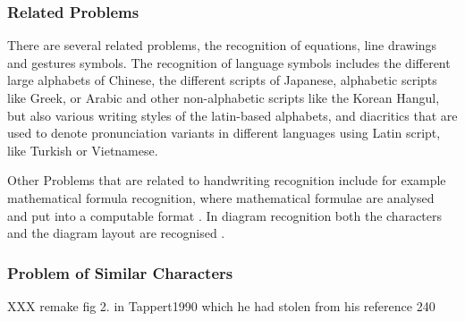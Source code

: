 \subsubsection{Related Problems}
\label{sec:relatedproblems}

There are several related problems, the recognition of equations, line 
drawings and gestures symbols. The recognition of language symbols includes 
the different large alphabets of Chinese, the different scripts of Japanese, 
alphabetic scripts like Greek, or Arabic and other non-alphabetic scripts like
the Korean  Hangul, but also various writing styles of the latin-based 
alphabets, and diacritics that are used to denote pronunciation variants in 
different languages using Latin script, like Turkish or Vietnamese.

Other Problems that are related to handwriting recognition include for example
mathematical formula recognition, where mathematical formulae are analysed and 
put into a computable format . In diagram recognition 
both the characters and the diagram layout are recognised 
.

\subsubsection{Problem of Similar Characters}
\label{sec:similarcharacters}

XXX remake fig 2. in Tappert1990 which he had stolen from his reference 240

